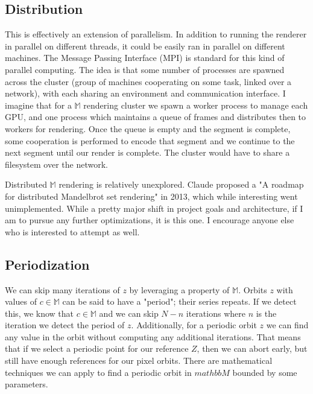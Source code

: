 \documentclass{article}
\begin{document}
\subsection{Distribution}
\par This is effectively an extension of parallelism. In addition to running the renderer in parallel on different threads, it could be easily ran in parallel on different machines. The Message Passing Interface (MPI) is standard for this kind of parallel computing. The idea is that some number of processes are spawned across the cluster (group of machines cooperating on some task, linked over a network), with each sharing an environment and communication interface. I imagine that for a $\mathbb{M}$ rendering cluster we spawn a worker process to manage each GPU, and one process which maintains a queue of frames and distributes then to workers for rendering. Once the queue is empty and the segment is complete, some cooperation is performed to encode that segment and we continue to the next segment until our render is complete. The cluster would have to share a filesystem over the network.
\par Distributed $\mathbb{M}$ rendering is relatively unexplored. Claude proposed a "A roadmap for distributed Mandelbrot set rendering" in 2013, which while interesting went unimplemented\cite{Allen_2013_04}. While a pretty major shift in project goals and architecture, if I am to pursue any further optimizations, it is this one. I encourage anyone else who is interested to attempt as well.
\subsection{Periodization}
\par We can skip many iterations of $z$ by leveraging a property of $\mathbb{M}$. Orbits $z$ with values of $c\in \mathbb{M}$ can be said to have a "period"; their series repeats. If we detect this, we know that $c\in \mathbb{M}$ and we can skip $N - n$ iterations where $n$ is the iteration we detect the period of $z$. Additionally, for a periodic orbit $z$ we can find any value in the orbit without computing any additional iterations. That means that if we select a periodic point for our reference $Z$, then we can abort early, but still have enough references for our pixel orbits. There are mathematical techniques we can apply to find a periodic orbit in $mathbb{M}$ bounded by some parameters\cite{Thompson_2023}.

\printbibliography
\end{document}
